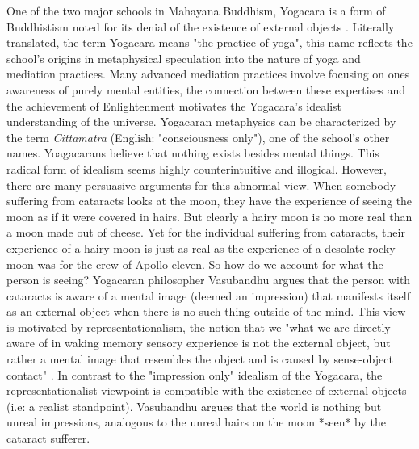One of the two major schools in Mahayana Buddhism, Yogacara is a form of Buddhistism noted for its denial of the existence of external objects \cite{siderits2007buddhism} . Literally translated, the term Yogacara means "the practice of yoga", this name reflects the school's origins in metaphysical speculation into the nature of yoga and mediation practices. Many advanced mediation practices involve focusing on ones awareness of purely mental entities, the connection between these expertises and the achievement of Enlightenment motivates the Yogacara's idealist understanding of the universe. Yogacaran metaphysics can be characterized by the term \textit{Cittamatra} (English: "consciousness only"), one of the school's other names. Yoagacarans believe that nothing exists besides mental things. This radical form of idealism seems highly counterintuitive and illogical. However, there are many persuasive arguments for this abnormal view. When somebody suffering from cataracts looks at the moon, they have the experience of seeing the moon as if it were covered in hairs. But clearly a hairy moon is no more real than a moon made out of cheese. Yet for the individual suffering from cataracts, their experience of a hairy moon is just as real as the experience of a desolate rocky moon was for the crew of Apollo eleven. So how do we account for what the person is seeing? Yogacaran philosopher Vasubandhu argues that the person with cataracts is aware of a mental image (deemed an impression) that manifests itself as an external object when there is no such thing outside of the mind. This view is motivated by representationalism, the notion that we "what we are directly aware of in waking memory sensory experience is not the external object, but rather a mental image that resembles the object and is caused by sense-object contact" \cite{siderits2007buddhism}.  \newline In contrast to the "impression only" idealism of the Yogacara, the representationalist viewpoint is compatible with the existence of external objects (i.e: a realist standpoint). Vasubandhu argues that the world is nothing but unreal impressions, analogous to the unreal hairs on the moon *seen* by the cataract sufferer.
 \newline
